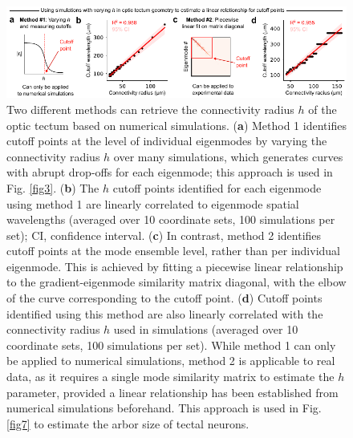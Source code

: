 \documentclass{article}
\begin{document}
\begin{figure}[t]
    \centering
    \includegraphics[width=1.0\linewidth]{figures/supp_tectum_cutoff.pdf}
    \caption{Two different methods can retrieve the connectivity radius $h$ of the optic tectum based on numerical simulations. (\textbf{a}) Method 1 identifies cutoff points at the level of individual eigenmodes by varying the connectivity radius $h$ over many simulations, which generates curves with abrupt drop-offs for each eigenmode; this approach is used in Fig. \ref{fig3}. (\textbf{b}) The $h$ cutoff points identified for each eigenmode using method 1 are linearly correlated to eigenmode spatial wavelengths (averaged over 10 coordinate sets, 100 simulations per set); CI, confidence interval. (\textbf{c}) In contrast, method 2 identifies cutoff points at the mode ensemble level, rather than per individual eigenmode. This is achieved by fitting a piecewise linear relationship to the gradient-eigenmode similarity matrix diagonal, with the elbow of the curve corresponding to the cutoff point. (\textbf{d}) Cutoff points identified using this method are also linearly correlated with the connectivity radius $h$ used in simulations (averaged over 10 coordinate sets, 100 simulations per set). While method 1 can only be applied to numerical simulations, method 2 is applicable to real data, as it requires a single mode similarity matrix to estimate the $h$ parameter, provided a linear relationship has been established from numerical simulations beforehand. This approach is used in Fig. \ref{fig7} to estimate the arbor size of tectal neurons.}
    \label{supp_tectum_cutoff}
\end{figure}

\newpage
\end{document}
